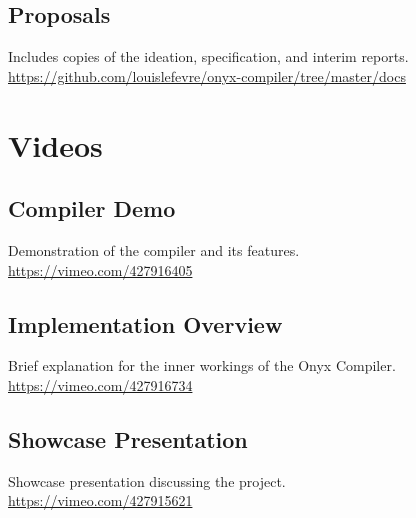 \documentclass[
]{report}
\begin{document}
\begin{appendices}
	\section{Proposals}
	\label{appendix:proposals}
	Includes copies of the ideation, specification, and interim reports.\\
	\url{https://github.com/louislefevre/onyx-compiler/tree/master/docs}
	
	\chapter{Videos}
	\section{Compiler Demo}
	\label{appendix:demo-video}
	Demonstration of the compiler and its features.\\
	\url{https://vimeo.com/427916405}
	\section{Implementation Overview}
	\label{appendix:implementation-video}
	Brief explanation for the inner workings of the Onyx Compiler.\\
	\url{https://vimeo.com/427916734}
	\section{Showcase Presentation}
	\label{appendix:showcase-video}
	Showcase presentation discussing the project.\\
	\url{https://vimeo.com/427915621}
	

\end{appendices}
\end{document}
